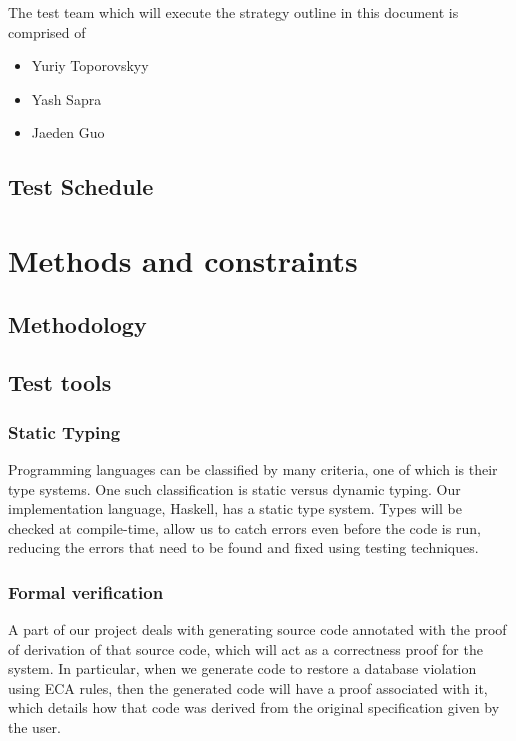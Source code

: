 \documentclass[12pt]{report}
\begin{document}
The test team which will execute the strategy outline in this document is comprised of
\begin{itemize}
\item Yuriy Toporovskyy  
\item Yash Sapra        
\item Jaeden Guo         
\end{itemize}

\section{Test Schedule}\label{sec:TestSched}


\chapter{Methods and constraints}\label{ch:Methods}
\section{Methodology}\label{sec:Methodology}
\section{Test tools}\label{sec:TestTools}

\subsection{Static Typing}\label{subsec:Static}
Programming languages can be classified by many criteria, one of which is their
type systems. One such classification is static versus dynamic typing. Our
implementation language, Haskell, has a static type system. Types will be
checked at compile-time, allow us to catch errors even before the code is run,
reducing the errors that need to be found and fixed using testing techniques. 

\subsection{Formal verification}\label{subsec:FormalVer}
A part of our project deals with generating source code annotated with the proof
of derivation of that source code, which will act as a correctness proof for the
system. In particular, when we generate code to restore a database violation
using ECA rules, then the generated code will have a proof associated with it,
which details how that code was derived from the original specification given by
the user.
\end{document}
